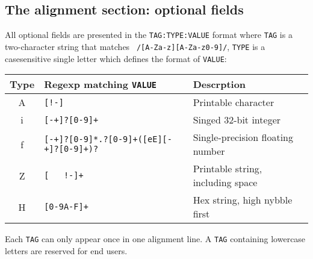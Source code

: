 \documentclass[10pt]{article}
\begin{document}
\subsection{The alignment section: optional fields}
All optional fields are presented in the {\tt TAG:TYPE:VALUE} format
where {\tt TAG} is a two-character string that matches {\tt
  /[A-Za-z][A-Za-z0-9]/}, {\tt TYPE} is a casesensitive single letter which
defines the format of {\tt VALUE}:
\begin{center}\small
\begin{tabular}{cll}
\hline
{\bf Type} & {\bf Regexp matching {\tt VALUE}} & {\bf Descrption} \\
\hline
A & {\tt [!-\char126]} & Printable character \\
i & {\tt [-+]?[0-9]+} & Singed 32-bit integer \\
f & {\tt [-+]?[0-9]*\char92.?[0-9]+([eE][-+]?[0-9]+)?} & Single-precision floating number \\
Z & {\tt [\,\,\,!-\char126]+} & Printable string, including space\\
H & {\tt [0-9A-F]+} & Hex string, high nybble first \\
\hline
\end{tabular}
\end{center}
Each {\tt TAG} can only appear once in one alignment line. A {\tt TAG}
containing lowercase letters are reserved for end users.
\end{document}

